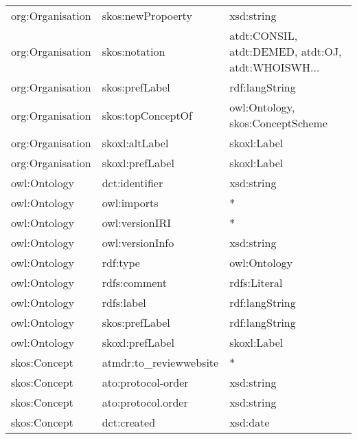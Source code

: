 \documentclass[10pt,a4paper,titlepage,final]{article}
\begin{document}
\begin{longtable}{lll}
    org:Organisation &       skos:newPropoerty &                                         xsd:string \\
    org:Organisation &           skos:notation &  atdt:CONSIL, atdt:DEMED, atdt:OJ, atdt:WHOISWH... \\
    org:Organisation &          skos:prefLabel &                                     rdf:langString \\
    org:Organisation &       skos:topConceptOf &                   owl:Ontology, skos:ConceptScheme \\
    org:Organisation &          skoxl:altLabel &                                        skoxl:Label \\
    org:Organisation &         skoxl:prefLabel &                                        skoxl:Label \\
        owl:Ontology &          dct:identifier &                                         xsd:string \\
        owl:Ontology &             owl:imports &                                                  * \\
        owl:Ontology &          owl:versionIRI &                                                  * \\
        owl:Ontology &         owl:versionInfo &                                         xsd:string \\
        owl:Ontology &                rdf:type &                                       owl:Ontology \\
        owl:Ontology &            rdfs:comment &                                       rdfs:Literal \\
        owl:Ontology &              rdfs:label &                                     rdf:langString \\
        owl:Ontology &          skos:prefLabel &                                     rdf:langString \\
        owl:Ontology &         skoxl:prefLabel &                                        skoxl:Label \\
        skos:Concept &  atmdr:to\_reviewwebsite &                                                  * \\
        skos:Concept &      ato:protocol-order &                                         xsd:string \\
        skos:Concept &      ato:protocol.order &                                         xsd:string \\
        skos:Concept &             dct:created &                                           xsd:date \\

\end{longtable}
\end{document}
